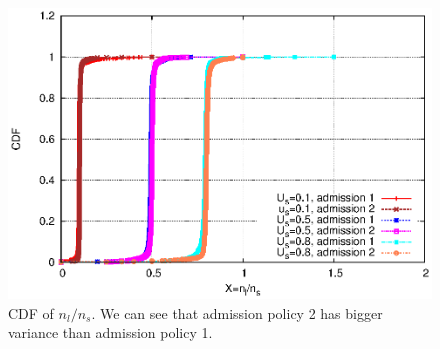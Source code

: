 \documentclass[paper]{ieice}
\begin{document}
\begin{figure}[hb] 
\begin{center}
\includegraphics[scale=0.5]{graphs/cdf.eps}
\end{center}
\caption{CDF of $n_l/n_s$. We can see that admission policy 2 has bigger variance than admission policy 1.}
\label{fig:cdf}
\vspace{-2mm}
 \end{figure}
 
\end{document}
